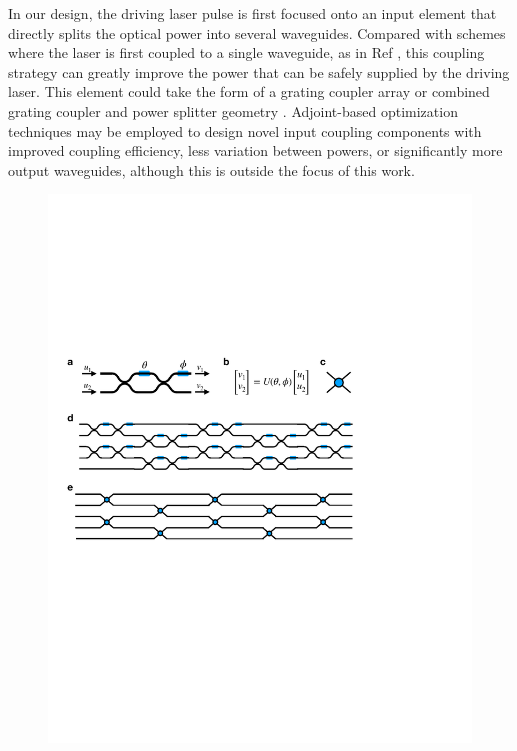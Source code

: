 In our design, the driving laser pulse is first focused onto an input element that directly splits the optical power into several waveguides.  Compared with schemes where the laser is first coupled to a single waveguide, as in Ref \cite{hughes_-chip_2018}, this coupling strategy can greatly improve the power that can be safely supplied by the driving laser. This element could take the form of a grating coupler array or combined grating coupler and power splitter geometry \cite{spuesens_grating_2016}.  Adjoint-based optimization techniques \cite{sapra2019inverse} may be employed to design novel input coupling components with improved coupling efficiency, less variation between powers, or significantly more output waveguides, although this is outside the focus of this work.

\begin{figure}
\includegraphics[width=1\columnwidth]{figures/MZI_MZI}

\end{figure}
